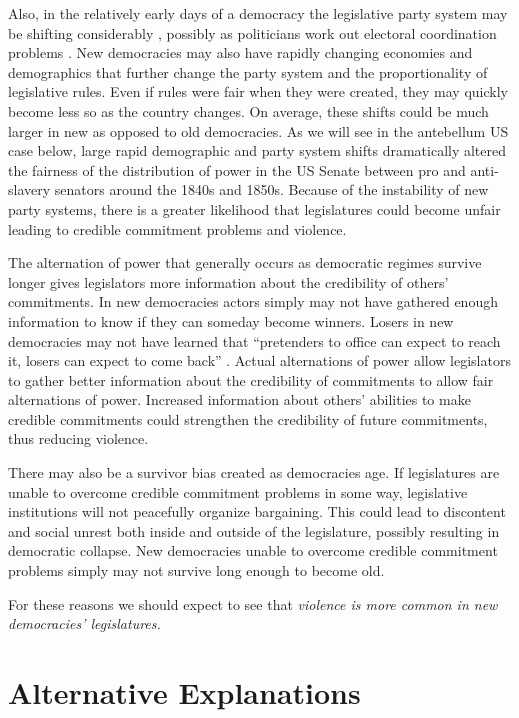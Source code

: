 \documentclass[a4paper]{article}\usepackage[]{graphicx}\usepackage[]{color}
\begin{document}
Also, in the relatively early days of a democracy the legislative party system may be shifting considerably \cite[see][161 for a review]{Mainwaring2007b}, possibly as politicians work out electoral coordination problems \citep{cox1997}. New democracies may also have rapidly changing economies and demographics that further change the party system and the proportionality of legislative rules. Even if rules were fair when they were created, they may quickly become less so as the country changes. On average, these shifts could be much larger in new as opposed to old democracies. As we will see in the antebellum US case below, large rapid demographic and party system shifts dramatically altered the fairness of the distribution of power in the US Senate between pro and anti-slavery senators around the 1840s and 1850s. Because of the instability of new party systems, there is a greater likelihood that legislatures could become unfair leading to credible commitment problems and violence.

The alternation of power that generally occurs as democratic regimes survive longer gives legislators more information about the credibility of others' commitments. In new democracies actors simply may not have gathered enough information to know if they can someday become winners. Losers in new democracies may not have learned that ``pretenders to office can expect to reach it, losers can expect to come back'' \citep[][36]{Przeworski1991}. Actual alternations of power allow legislators to gather better information about the credibility of commitments to allow fair alternations of power. Increased information about others' abilities to make credible commitments could strengthen the credibility of future commitments, thus reducing violence.

There may also be a survivor bias created as democracies age. If legislatures are unable to overcome credible commitment problems in some way, legislative institutions will not peacefully organize bargaining. This could lead to discontent and social unrest both inside and outside of the legislature, possibly resulting in democratic collapse. New democracies unable to overcome credible commitment problems simply may not survive long enough to become old.

For these reasons we should expect to see that \emph{violence is more common in new democracies' legislatures.}

\section{Alternative Explanations}
\end{document}
